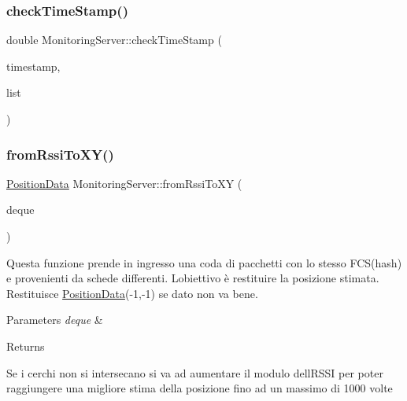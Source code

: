 \mbox{\label{class_monitoring_server_a645e06f62742717a286f2cfd9bad6fb0}} 
\subsubsection{\texorpdfstring{check\+Time\+Stamp()}{checkTimeStamp()}}
{\footnotesize\ttfamily double Monitoring\+Server\+::check\+Time\+Stamp (\begin{DoxyParamCaption}\item[{uint32\+\_\+t}]{timestamp,  }\item[{std\+::list$<$ uint32\+\_\+t $>$}]{list }\end{DoxyParamCaption})}

\mbox{\label{class_monitoring_server_aa18eeed56d82fb3de1a4fe1ac1820b73}} 
\subsubsection{\texorpdfstring{from\+Rssi\+To\+X\+Y()}{fromRssiToXY()}}
{\footnotesize\ttfamily \hyperlink{class_position_data}{Position\+Data} Monitoring\+Server\+::from\+Rssi\+To\+XY (\begin{DoxyParamCaption}\item[{const std\+::deque$<$ \hyperlink{class_packet}{Packet} $>$ \&}]{deque }\end{DoxyParamCaption})}

Questa funzione prende in ingresso una coda di pacchetti con lo stesso F\+C\+S(hash) e provenienti da schede differenti. L\textquotesingle{}obiettivo è restituire la posizione stimata. Restituisce \hyperlink{class_position_data}{Position\+Data}(-\/1,-\/1) se dato non va bene. 
\begin{DoxyParams}{Parameters}
{\em deque} & \\
\hline
\end{DoxyParams}
\begin{DoxyReturn}{Returns}

\end{DoxyReturn}
Se i cerchi non si intersecano si va ad aumentare il modulo dell\textquotesingle{}R\+S\+SI per poter raggiungere una migliore stima della posizione fino ad un massimo di 1000 volte\mbox{\label{class_monitoring_server_a5a1e4be78d806bf0960eb35b445b45b2}} 
